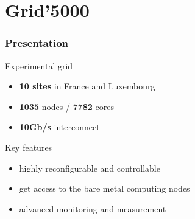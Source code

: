 \documentclass{beamer}
\title{\EventName}
\subtitle{\TPindex: \TPtitle}
\author{\authors}
\institute[UL]{
  University of Luxembourg, Luxembourg
}
\date{}
\begin{document}
\begin{frame}
    \vspace{2.5em}
    \titlepage
\end{frame}



\section{Grid'5000}

\begin{frame}[fragile]
    \frametitle{Presentation}
Experimental grid
    \begin{itemize}
      \item \textbf{10 sites} in France and Luxembourg
      \item \textbf{1035} nodes / \textbf{7782} cores
      \item \textbf{10Gb/s} interconnect
	\end{itemize}

Key features
    \begin{itemize}
      \item highly reconfigurable and controllable
      \item get access to the bare metal computing nodes
      \item advanced monitoring and measurement
	\end{itemize}

\end{frame}
\end{document}
